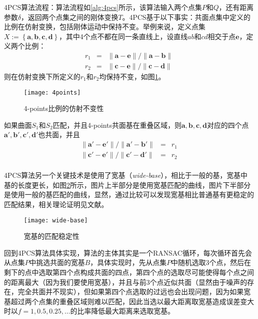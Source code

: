 {\kai 4PCS算法流程}：算法流程如\ref{alg:4pcs}所示，该算法输入两个点集$P$和$Q$，还有距离参数$\delta$，返回两个点集之间的刚体变换$T$。4PCS基于以下事实：{\kai 共面点集中定义的比例在仿射变换，包括刚体运动中保持不变。}举例来说，定义点集$X:=\left\{\mathbf{a},\mathbf{b},\mathbf{c},\mathbf{d}\right\}$，其中4个点不都在同一条直线上，设直线$ab$和$cd$相交于点$\mathbf{e}$，定义两个比例：
\begin{equation}
  \begin{array}{ccc}
    r_1& =& {\parallel \mathbf{a}-\mathbf{e}\parallel}/{\parallel \mathbf{a}-\mathbf{b}\parallel}\\
    r_2& =& {\parallel \mathbf{c}-\mathbf{e}\parallel}/{\parallel \mathbf{c}-\mathbf{d}\parallel}
  \end{array}
\end{equation}
则在仿射变换下所定义的$r_1$和$r_2$均保持不变，如图\ref{fig:4points}。
\begin{figure}[ht]
  \centering
  \texttt{[image: 4points]}
  \caption{4-points比例的仿射不变性}
  \label{fig:4points}
\end{figure}
如果曲面$S_1$和$S_2$匹配，并且4-points共面基在重叠区域，则$\mathbf{a},\mathbf{b},\mathbf{c},\mathbf{d}$对应的四个点$\mathbf{a}',\mathbf{b}',\mathbf{c}',\mathbf{d}'$也共面，并且
\begin{equation}
  \begin{array}{ccc}
    {\parallel \mathbf{a}'-\mathbf{e}'\parallel}/{\parallel \mathbf{a}'-\mathbf{b}'\parallel}&=&r_1\\
    {\parallel \mathbf{c}'-\mathbf{e}'\parallel}/{\parallel \mathbf{c}'-\mathbf{d}'\parallel}&=&r_2\\
  \end{array}
\end{equation}


4PCS算法另一个关键技术是使用了{\kai 宽基}（\emph{wide-base}），相比于一般的基，宽基中基的长度更长，如图\ref{fig:wide-base}所示，图片上半部分是使用宽基匹配的曲线，图片下半部分是使用一般的基匹配的曲线，显然，通过比较可以发现宽基相比普通基有更稳定的匹配结果，相关理论证明见文献\cite{goodrich1994practical}。
\begin{figure}[ht]
  \centering
  \texttt{[image: wide-base]}
  \caption{宽基的匹配稳定性}
  \label{fig:wide-base}
\end{figure}

回到4PCS算法具体实现，算法的主体其实是一个RANSAC循环，每次循环首先会从点集$P$中挑选共面的宽基$B$，具体实现时，先从点集$P$中随机选取3个点，然后在剩下的点中选取第四个点构成共面的四点，第四个点的选取尽可能使得每个点之间的距离最大（因为我们要使用宽基），并且与前3个点近似共面（显然由于噪声的存在，完全共面并不现实），但如果第四个点选取的过远也会出现问题，因为如果宽基超过两个点集的重叠区域则难以匹配，因此当选以最大距离取宽基造成误差变大时以$f=1,0.5,0.25,\ldots$的比率降低最大距离来选取宽基。

